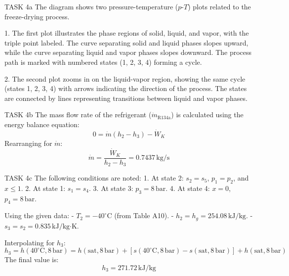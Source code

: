 TASK 4a  
The diagram shows two pressure-temperature (\(p\)-\(T\)) plots related to the freeze-drying process.  

1. The first plot illustrates the phase regions of solid, liquid, and vapor, with the triple point labeled. The curve separating solid and liquid phases slopes upward, while the curve separating liquid and vapor phases slopes downward. The process path is marked with numbered states (1, 2, 3, 4) forming a cycle.  

2. The second plot zooms in on the liquid-vapor region, showing the same cycle (states 1, 2, 3, 4) with arrows indicating the direction of the process. The states are connected by lines representing transitions between liquid and vapor phases.  

TASK 4b  
The mass flow rate of the refrigerant (\( \dot{m}_{\text{R134a}} \)) is calculated using the energy balance equation:  
\[
0 = \dot{m}(h_2 - h_3) - \dot{W}_K
\]
Rearranging for \( \dot{m} \):  
\[
\dot{m} = \frac{\dot{W}_K}{h_2 - h_3} = 0.7437 \, \text{kg/s}
\]  

TASK 4c  
The following conditions are noted:  
1. At state 2: \( s_2 = s_5 \), \( p_1 = p_2 \), and \( x \leq 1 \).  
2. At state 1: \( s_1 = s_4 \).  
3. At state 3: \( p_3 = 8 \, \text{bar} \).  
4. At state 4: \( x = 0 \), \( p_4 = 8 \, \text{bar} \).  

Using the given data:  
- \( T_2 = -40^\circ\text{C} \) (from Table A10).  
- \( h_2 = h_g = 254.08 \, \text{kJ/kg} \).  
- \( s_3 = s_2 = 0.835 \, \text{kJ/kg·K} \).  

Interpolating for \( h_3 \):  
\[
h_3 = h(40^\circ\text{C}, 8 \, \text{bar}) = h(\text{sat}, 8 \, \text{bar}) + \left[ s(40^\circ\text{C}, 8 \, \text{bar}) - s(\text{sat}, 8 \, \text{bar}) \right] + h(\text{sat}, 8 \, \text{bar})
\]
The final value is:  
\[
h_3 = 271.72 \, \text{kJ/kg}
\]